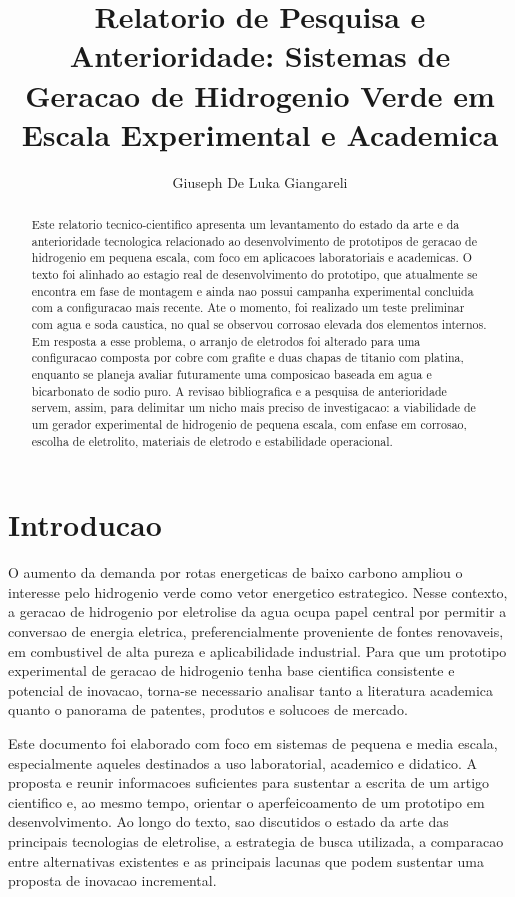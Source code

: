 \documentclass[12pt,oneside,a4paper,english,brazilian]{abntex2}
\title{Relatorio de Pesquisa e Anterioridade: Sistemas de Geracao de Hidrogenio Verde em Escala Experimental e Academica}
\author{Giuseph De Luka Giangareli}
\date{}
\begin{document}
\maketitle

\begin{abstract}
Este relatorio tecnico-cientifico apresenta um levantamento do estado da arte e da anterioridade tecnologica relacionado ao desenvolvimento de prototipos de geracao de hidrogenio em pequena escala, com foco em aplicacoes laboratoriais e academicas. O texto foi alinhado ao estagio real de desenvolvimento do prototipo, que atualmente se encontra em fase de montagem e ainda nao possui campanha experimental concluida com a configuracao mais recente. Ate o momento, foi realizado um teste preliminar com agua e soda caustica, no qual se observou corrosao elevada dos elementos internos. Em resposta a esse problema, o arranjo de eletrodos foi alterado para uma configuracao composta por cobre com grafite e duas chapas de titanio com platina, enquanto se planeja avaliar futuramente uma composicao baseada em agua e bicarbonato de sodio puro. A revisao bibliografica e a pesquisa de anterioridade servem, assim, para delimitar um nicho mais preciso de investigacao: a viabilidade de um gerador experimental de hidrogenio de pequena escala, com enfase em corrosao, escolha de eletrolito, materiais de eletrodo e estabilidade operacional.
\end{abstract}

\section{Introducao}

O aumento da demanda por rotas energeticas de baixo carbono ampliou o interesse pelo hidrogenio verde como vetor energetico estrategico. Nesse contexto, a geracao de hidrogenio por eletrolise da agua ocupa papel central por permitir a conversao de energia eletrica, preferencialmente proveniente de fontes renovaveis, em combustivel de alta pureza e aplicabilidade industrial. Para que um prototipo experimental de geracao de hidrogenio tenha base cientifica consistente e potencial de inovacao, torna-se necessario analisar tanto a literatura academica quanto o panorama de patentes, produtos e solucoes de mercado.

Este documento foi elaborado com foco em sistemas de pequena e media escala, especialmente aqueles destinados a uso laboratorial, academico e didatico. A proposta e reunir informacoes suficientes para sustentar a escrita de um artigo cientifico e, ao mesmo tempo, orientar o aperfeicoamento de um prototipo em desenvolvimento. Ao longo do texto, sao discutidos o estado da arte das principais tecnologias de eletrolise, a estrategia de busca utilizada, a comparacao entre alternativas existentes e as principais lacunas que podem sustentar uma proposta de inovacao incremental.
\end{document}
